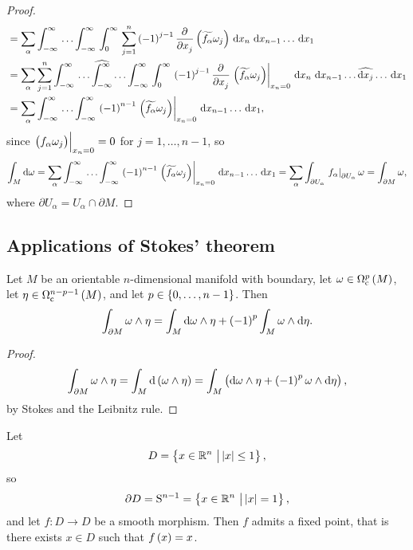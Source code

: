 \begin{proof}
\begin{align*}
& = \sum_\alpha \intd{-\infty}{\infty}{\dots \intd{-\infty}{\infty}{\intd{0}{\infty}{\sum_{j = 1}^n \br{-1}^{j - 1}\dpd{}{x_j}\br{\widetilde{f_\alpha}\omega_j}}{x_n}}{x_{n - 1} \dots}}{x_1} \\
& = \sum_\alpha \sum_{j = 1}^n \intd{-\infty}{\infty}{\dots \widehat{\int_{-\infty}^\infty} \dots \intd{-\infty}{\infty}{\intd{0}{\infty}{\br{-1}^{j - 1}\dpd{}{x_j}\eval{\br{\widetilde{f_\alpha}\omega_j}}_{x_n = 0}}{x_n}}{x_{n - 1} \dots \widehat{\d x_j} \dots}}{x_1} \\
& = \sum_\alpha \intd{-\infty}{\infty}{\dots \intd{-\infty}{\infty}{\br{-1}^{n - 1}\eval{\br{\widetilde{f_\alpha}\omega_j}}_{x_n = 0}}{x_{n - 1} \dots}}{x_1},
\end{align*}
since $ \eval{\br{f_\alpha\omega_j}}_{x_n = 0} = 0 $ for $ j = 1, \dots, n - 1 $, so
$$ \int_M \d\omega = \sum_\alpha \intd{-\infty}{\infty}{\dots \intd{-\infty}{\infty}{\br{-1}^{n - 1}\eval{\br{\widetilde{f_\alpha}\omega_j}}_{x_n = 0}}{x_{n - 1} \dots}}{x_1} = \sum_\alpha \int_{\partial U_\alpha} \eval{f_\alpha}_{\partial U_\alpha}\omega = \int_{\partial M} \omega, $$
where $ \partial U_\alpha = U_\alpha \cap \partial M $.
\end{proof}

\pagebreak

\subsection{Applications of Stokes' theorem}


\begin{theorem}
Let $ M $ be an orientable $ n $-dimensional manifold with boundary, let $ \omega \in \Omega_\c^p\br{M} $, let $ \eta \in \Omega_\c^{n - p - 1}\br{M} $, and let $ p \in \cbr{0, \dots, n - 1} $. Then
$$ \int_{\partial M} \omega \wedge \eta = \int_M \d\omega \wedge \eta + \br{-1}^p\int_M \omega \wedge \d\eta. $$
\end{theorem}

\begin{proof}
$$ \int_{\partial M} \omega \wedge \eta = \int_M \d\br{\omega \wedge \eta} = \int_M \br{\d\omega \wedge \eta + \br{-1}^p\omega \wedge \d\eta}, $$
by Stokes and the Leibnitz rule.
\end{proof}

\begin{theorem}
Let
$$ D = \cbr{x \in \RR^n \st \abs{x} \le 1}, $$
so
$$ \partial D = \S^{n - 1} = \cbr{x \in \RR^n \st \abs{x} = 1}, $$
and let $ f : D \to D $ be a smooth morphism. Then $ f $ admits a fixed point, that is there exists $ x \in D $ such that $ f\br{x} = x $.
\end{theorem}

